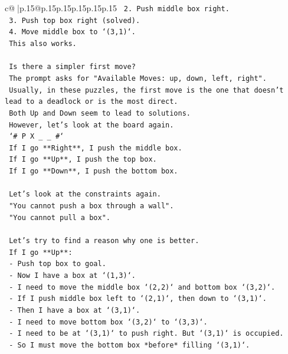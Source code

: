 \documentclass{article}
\begin{document}
{\begin{supertabular}{c@{$\;$}|p{.15\linewidth}@{}p{.15\linewidth}p{.15\linewidth}p{.15\linewidth}p{.15\linewidth}p{.15\linewidth}}
{{{\texttt{    2. Push middle box right.} \\
\texttt{    3. Push top box right (solved).} \\
\texttt{    4. Move middle box to `(3,1)`.} \\
\texttt{    This also works.} \\
\\ 
\texttt{    Is there a simpler first move?} \\
\texttt{    The prompt asks for "Available Moves: up, down, left, right".} \\
\texttt{    Usually, in these puzzles, the first move is the one that doesn't lead to a deadlock or is the most direct.} \\
\texttt{    Both Up and Down seem to lead to solutions.} \\
\texttt{    However, let's look at the board again.} \\
\texttt{    `\# P X \_ \_ \#`} \\
\texttt{    If I go **Right**, I push the middle box.} \\
\texttt{    If I go **Up**, I push the top box.} \\
\texttt{    If I go **Down**, I push the bottom box.} \\
\\ 
\texttt{    Let's look at the constraints again.} \\
\texttt{    "You cannot push a box through a wall".} \\
\texttt{    "You cannot pull a box".} \\
\\ 
\texttt{    Let's try to find a reason why one is better.} \\
\texttt{    If I go **Up**:} \\
\texttt{    {-} Push top box to goal.} \\
\texttt{    {-} Now I have a box at `(1,3)`.} \\
\texttt{    {-} I need to move the middle box `(2,2)` and bottom box `(3,2)`.} \\
\texttt{    {-} If I push middle box left to `(2,1)`, then down to `(3,1)`.} \\
\texttt{    {-} Then I have a box at `(3,1)`.} \\
\texttt{    {-} I need to move bottom box `(3,2)` to `(3,3)`.} \\
\texttt{    {-} I need to be at `(3,1)` to push right. But `(3,1)` is occupied.} \\
\texttt{    {-} So I must move the bottom box *before* filling `(3,1)`.} \\
}}}
\end{supertabular}}
\end{document}
